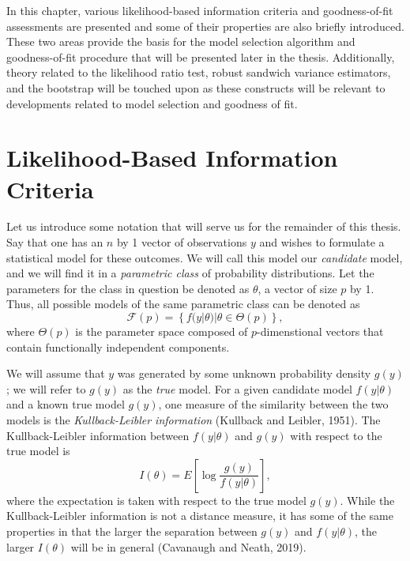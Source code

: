 \doublespace
{}
		In this chapter, various likelihood-based information criteria and goodness-of-fit assessments are presented and some of their properties are also briefly introduced.
		These two areas provide the basis for the model selection algorithm and goodness-of-fit procedure that will be presented later in the thesis. Additionally, theory
		related to the likelihood ratio test, robust sandwich variance estimators, and the bootstrap will be touched upon as these constructs will be relevant to developments
		related to model selection and goodness of fit.
		
		\section{Likelihood-Based Information Criteria}

		Let us introduce some notation that will serve us for the remainder of this thesis. Say that one has an $n$ by 1  vector of observations $y$ and wishes to formulate a
		statistical model for these outcomes. We will call this model our \textit{candidate} model, and we will find it in a \textit{parametric class} of probability distributions.
		Let the parameters for the class in question be denoted as $\theta$, a vector of size $p$ by 1. Thus, all possible models of the same parametric class can be denoted
		as
		\begin{equation}
			\mathcal{F}(p) = \left\{ f(y|\theta) | \theta \in \Theta(p) \right\} ,
		\end{equation}
		where $\Theta(p)$ is the parameter space composed of $p$-dimenstional vectors that contain functionally independent components.

		We will assume that $y$ was generated by some unknown probability density $g(y)$; we will refer to $g(y)$ as the \textit{true} model. For a given candidate model $f(y|\theta)$
		and a known true model $g(y)$, one measure of the similarity between the two models is the \textit{Kullback-Leibler information} (Kullback and Leibler, 1951). The Kullback-Leibler
		information between $f(y|\theta)$ and $g(y)$ with respect to the true model is
		\begin{equation}
			I(\theta) = E \left[ \log \frac{g(y)}{f(y|\theta)} \right],
		\end{equation}
		where the expectation is taken with respect to the true model $g(y)$. While the Kullback-Leibler information is not a distance measure, it has some of the same properties in
		that the larger the separation between $g(y)$ and $f(y|\theta)$, the larger $I(\theta)$ will be in general (Cavanaugh and Neath, 2019).
		
